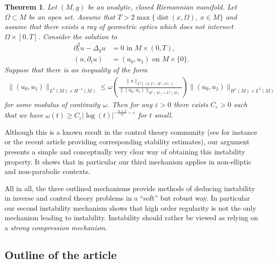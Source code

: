 \documentclass[12pt,twoside]{amsart}
\numberwithin{equation}{section}
\renewcommand{\leq}{\leqslant}
\renewcommand{\geq}{\geqslant}
\newtheorem{theorem}{Theorem}[section]
\newcommand {\p} {\partial}
\newcommand {\D} {\Delta}
\DeclareMathOperator {\dist} {dist}
\newcommand{\eps}{\varepsilon}
\begin{document}
\begin{theorem}
Let $(M,g)$ be an analytic, closed Riemannian manifold. Let $\Omega \subset M$ be an open set. Assume that $T > 2\max\{\dist(x,\Omega), \ x \in M\}$ and assume that there exists a ray of geometric optics which does not intersect $\Omega \times [0,T]$.
Consider the solution to
\begin{align*}
\p_t^2 u - \D_g u & = 0 \mbox{ in } M \times (0,T),\\
(u, \p_t u) & =(u_0,u_1) \mbox{ on } M \times \{0\}.
\end{align*}
Suppose that there is an inequality of the form
\begin{align*}
\|(u_0,u_1)\|_{L^2(M)\times H^{-1}(M)}
\leq \omega\left( \frac{\|u\|_{L^2((0,T),H^1(\Omega))}}{\|(u_0,u_1)\|_{H^1(M)\times L^2(M)}} \right) \|(u_0,u_1)\|_{H^1(M)\times L^2(M)}
\end{align*}
for some modulus of continuity $\omega$. Then for any $\eps>0$ there exists $C_{\eps}>0$ such that we have $\omega(t)\geq C_{\eps} |\log(t)|^{- \frac{n+2}{n}-\eps}$ for $t$ small.
\end{theorem}

Although this is a known result in the control theory community (see for instance \cite{Lebeau} or the recent article \cite{LaurentLeautaud} providing corresponding stability estimates), our argument presents a simple and conceptually very clear way of obtaining this instability property. It shows that in particular our third mechanism applies in non-elliptic and non-parabolic contexts.


\medskip

All in all, the three outlined mechanisms provide methods of deducing instability in inverse and control theory problems in a ``soft'' but robust way.
In particular our second instability mechanism shows that high order regularity is not the only mechanism leading to instability. Instability should rather be viewed as relying on a \emph{strong compression mechanism}.




\subsection{Outline of the article}
\end{document}
